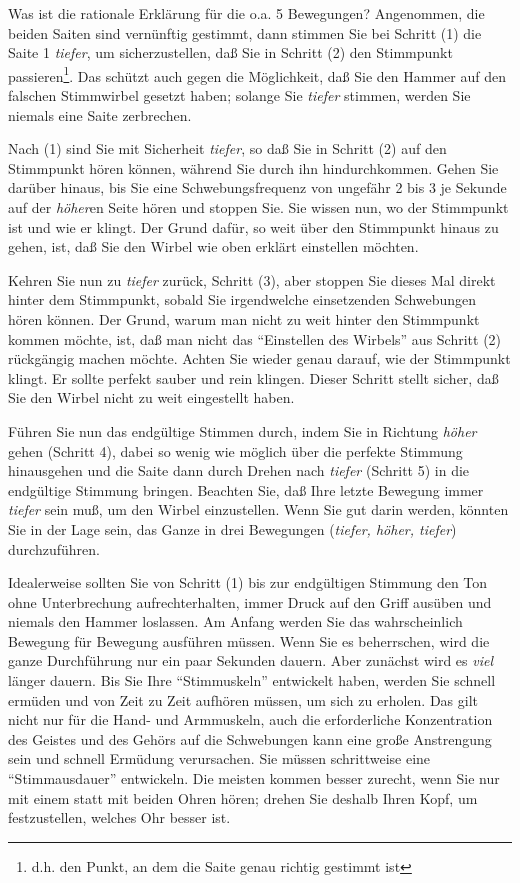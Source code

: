 Was ist die rationale Erklärung für die o.a. 5 Bewegungen?
 Angenommen, die beiden Saiten sind vernünftig gestimmt, dann stimmen Sie bei Schritt (1) die Saite 1 \textit{tiefer}, um sicherzustellen, daß Sie in Schritt (2) den Stimmpunkt passieren\footnote{d.h. den Punkt, an dem die Saite genau richtig gestimmt ist}.
 Das schützt auch gegen die Möglichkeit, daß Sie den Hammer auf den falschen Stimmwirbel gesetzt haben; solange Sie \textit{tiefer} stimmen, werden Sie niemals eine Saite zerbrechen.
 

Nach (1) sind Sie mit Sicherheit \textit{tiefer}, so daß Sie in Schritt (2) auf den Stimmpunkt hören können, während Sie durch ihn hindurchkommen.
 Gehen Sie darüber hinaus, bis Sie eine Schwebungsfrequenz von ungefähr 2 bis 3 je Sekunde auf der \textit{höher}en Seite hören und stoppen Sie.
 Sie wissen nun, wo der Stimmpunkt ist und wie er klingt.
 Der Grund dafür, so weit über den Stimmpunkt hinaus zu gehen, ist, daß Sie den Wirbel wie oben erklärt einstellen möchten.
 

Kehren Sie nun zu \textit{tiefer} zurück, Schritt (3), aber stoppen Sie dieses Mal direkt hinter dem Stimmpunkt, sobald Sie irgendwelche einsetzenden Schwebungen hören können.
 Der Grund, warum man nicht zu weit hinter den Stimmpunkt kommen möchte, ist, daß man nicht das \enquote{Einstellen des Wirbels} aus Schritt (2) rückgängig machen möchte.
 Achten Sie wieder genau darauf, wie der Stimmpunkt klingt.
 Er sollte perfekt sauber und rein klingen.
 Dieser Schritt stellt sicher, daß Sie den Wirbel nicht zu weit eingestellt haben.
 

Führen Sie nun das endgültige Stimmen durch, indem Sie in Richtung \textit{höher} gehen (Schritt 4), dabei so wenig wie möglich über die perfekte Stimmung hinausgehen und die Saite dann durch Drehen nach \textit{tiefer} (Schritt 5) in die endgültige Stimmung bringen.
 Beachten Sie, daß Ihre letzte Bewegung immer \textit{tiefer} sein muß, um den Wirbel einzustellen.
 Wenn Sie gut darin werden, könnten Sie in der Lage sein, das Ganze in drei Bewegungen (\textit{tiefer, höher, tiefer}) durchzuführen.
 

Idealerweise sollten Sie von Schritt (1) bis zur endgültigen Stimmung den Ton ohne Unterbrechung aufrechterhalten, immer Druck auf den Griff ausüben und niemals den Hammer loslassen.
 Am Anfang werden Sie das wahrscheinlich Bewegung für Bewegung ausführen müssen.
 Wenn Sie es beherrschen, wird die ganze Durchführung nur ein paar Sekunden dauern.
 Aber zunächst wird es \textit{viel} länger dauern.
 Bis Sie Ihre \enquote{Stimmuskeln} entwickelt haben, werden Sie schnell ermüden und von Zeit zu Zeit aufhören müssen, um sich zu erholen.
 Das gilt nicht nur für die Hand- und Armmuskeln, auch die erforderliche Konzentration des Geistes und des Gehörs auf die Schwebungen kann eine große Anstrengung sein und schnell Ermüdung verursachen.
 Sie müssen schrittweise eine \enquote{Stimmausdauer} entwickeln.
 Die meisten kommen besser zurecht, wenn Sie nur mit einem statt mit beiden Ohren hören; drehen Sie deshalb Ihren Kopf, um festzustellen, welches Ohr besser ist.
 

